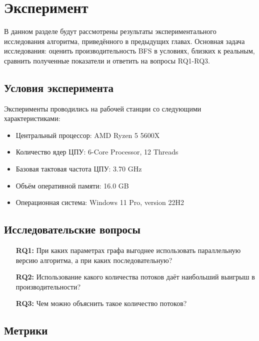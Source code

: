
\section{Эксперимент}

В данном разделе будут рассмотрены результаты экспериментального исследования алгоритма, приведённого в предыдущих главах. Основная задача исследования: оценить производительность BFS в условиях, близких к реальным, сравнить полученные показатели и ответить на вопросы RQ1-RQ3.

\subsection{Условия эксперимента}

Эксперименты проводились на рабочей станции со следующими характеристиками:
\begin{itemize}
    \item Центральный процессор: AMD Ryzen 5 5600X 
    \item Количество ядер ЦПУ: 6-Core Processor, 12 Threads 
    \item Базовая тактовая частота ЦПУ: 3.70 GHz
    \item Объём оперативной памяти: 16.0 GB
    \item Операционная система: Windows 11 Pro, version 22H2
\end{itemize}

\subsection{Исследовательские вопросы}

\begin{itemize}
    \item[\textbf{RQ1:}] При каких параметрах графа выгоднее использовать параллельную версию алгоритма, а при каких последовательную?
    \item[\textbf{RQ2:}] Использование какого количества потоков даёт наибольший выигрыш в производительности?
    \item[\textbf{RQ3:}] Чем можно объяснить такое количество потоков?
\end{itemize}

\subsection{Метрики}

